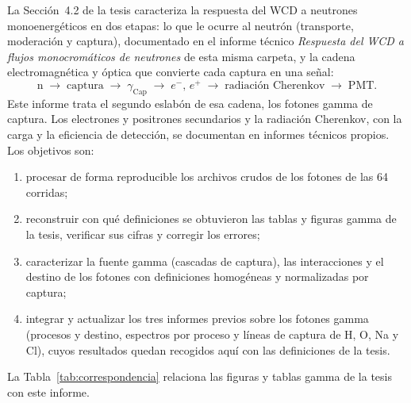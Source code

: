 \documentclass[11pt,a4paper]{article}
\begin{document}
La Sección~4.2 de la tesis caracteriza la respuesta del WCD a neutrones monoenergéticos en dos etapas: lo que le ocurre al neutrón (transporte, moderación y captura), documentado en el informe técnico \emph{Respuesta del WCD a flujos monocromáticos de neutrones} de esta misma carpeta, y la cadena electromagnética y óptica que convierte cada captura en una señal:
\[
\mathrm{n}\;\longrightarrow\;\text{captura}\;\longrightarrow\;\gamma_\mathrm{Cap}\;\longrightarrow\;e^-,\,e^+\;\longrightarrow\;\text{radiación Cherenkov}\;\longrightarrow\;\mathrm{PMT}.
\]
Este informe trata el segundo eslabón de esa cadena, los fotones gamma de captura. Los electrones y positrones secundarios y la radiación Cherenkov, con la carga y la eficiencia de detección, se documentan en informes técnicos propios. Los objetivos son:
\begin{enumerate}
  \item procesar de forma reproducible los archivos crudos de los fotones de las 64 corridas;
  \item reconstruir con qué definiciones se obtuvieron las tablas y figuras gamma de la tesis, verificar sus cifras y corregir los errores;
  \item caracterizar la fuente gamma (cascadas de captura), las interacciones y el destino de los fotones con definiciones homogéneas y normalizadas por captura;
  \item integrar y actualizar los tres informes previos sobre los fotones gamma (procesos y destino, espectros por proceso y líneas de captura de H, O, Na y Cl), cuyos resultados quedan recogidos aquí con las definiciones de la tesis.
\end{enumerate}

La Tabla~\ref{tab:correspondencia} relaciona las figuras y tablas gamma de la tesis con este informe.
\end{document}
